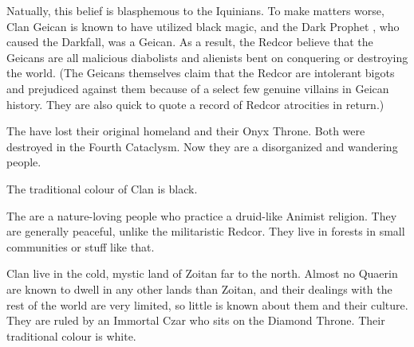 Natually, this belief is blasphemous to the Iquinians. To make matters worse, Clan Geican is known to have utilized black magic, and the Dark Prophet \Belzir{}, who caused the Darkfall, was a Geican. As a result, the Redcor believe that the Geicans are all malicious diabolists and alienists bent on conquering or destroying the world. (The Geicans themselves claim that the Redcor are intolerant bigots and prejudiced against them because of a select few genuine villains in Geican history. They are also quick to quote a record of Redcor atrocities in return.) 





The  have lost their original homeland and their Onyx Throne. Both were destroyed in the Fourth Cataclysm. Now they are a disorganized and wandering people. 

The traditional colour of Clan \Yrzhell{} is black. 

The \Yrzhell{} are a nature-loving people who practice a druid-like Animist religion. They are generally peaceful, unlike the militaristic Redcor. They live in forests in small communities or stuff like that. 

Clan  live in the cold, mystic land of Zoitan far to the north. Almost no Quaerin are known to dwell in any other lands than Zoitan, and their dealings with the rest of the world are very limited, so little is known about them and their culture. They are ruled by an Immortal Czar who sits on the Diamond Throne. Their traditional colour is white. 




